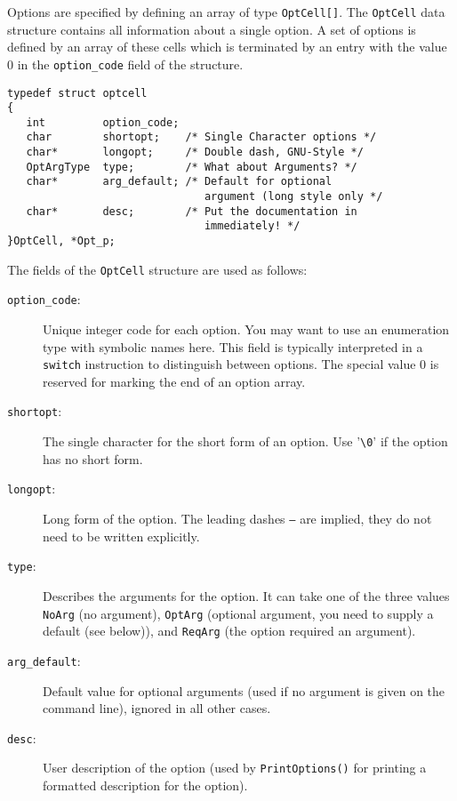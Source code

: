 Options are specified by defining an array of type \texttt{OptCell[]}.
The \texttt{OptCell} data structure contains all information about a
single option. A set of options is defined by an array of these cells
which is terminated by an entry with the value 0 in the
\texttt{option\_code} field of the structure.

\begin{verbatim}
typedef struct optcell
{
   int         option_code; 
   char        shortopt;    /* Single Character options */
   char*       longopt;     /* Double dash, GNU-Style */
   OptArgType  type;        /* What about Arguments? */
   char*       arg_default; /* Default for optional 
                               argument (long style only */
   char*       desc;        /* Put the documentation in
                               immediately! */
}OptCell, *Opt_p;
\end{verbatim}

The fields of the \texttt{OptCell} structure are used as follows:

\begin{description}
\item[\textmd{\texttt{option\_code}}:] Unique integer code for each
  option. You may want to use an enumeration type with symbolic names
  here.  This field is typically interpreted in a \texttt{switch}
  instruction to distinguish between options. The special value 0 is
  reserved for marking the end of an option array.
\item[\textmd{\texttt{shortopt}}:] The single character for the short
  form of an option. Use '\verb|\0|' if the option has no short form.
\item[\textmd{\texttt{longopt}}:] Long form of the option. The leading dashes
  \texttt{--} are implied, they do not need to be written explicitly.
\item[\textmd{\texttt{type}}:] Describes the arguments for the option. It can
  take one of the three values \texttt{NoArg} (no argument),
  \texttt{OptArg} (optional argument, you need to supply a default
  (see below)), and \texttt{ReqArg} (the option required an argument).
\item[\textmd{\texttt{arg\_default}}:] Default value for optional arguments
  (used if no argument is given on the command line), ignored in all
  other cases.
\item[\textmd{\texttt{desc}}:] User description of the option (used by
  \texttt{PrintOptions()} for printing a formatted description for the
  option).
\end{description}


